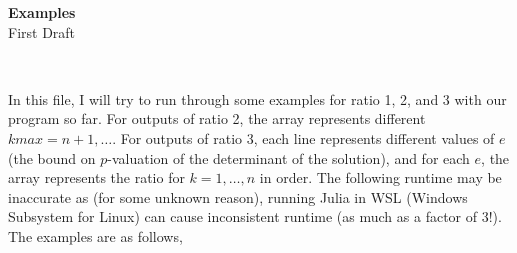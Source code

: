 \documentclass[letterpaper,12pt]{article}
\begin{document}

\begin{center}
    {\LARGE \textbf{Examples}} \\
    First Draft
\end{center}

\

In this file, I will try to run through some examples 
for ratio 1, 2, and 3 with our program so far. 
For outputs of ratio 2, the array represents different $kmax = n+1,\dots$.
For outputs of ratio 3, each line represents different values of $e$
(the bound on $p$-valuation of the determinant of the solution), and for each $e$,
the array represents the ratio for $k = 1, \dots, n$ in order.
The following runtime may be inaccurate as (for some unknown reason),
running Julia in WSL (Windows Subsystem for Linux) can cause inconsistent runtime 
(as much as a factor of 3!).
The examples are as follows,
\end{document}
